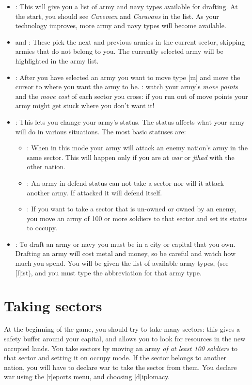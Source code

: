 \begin{itemize}

\item
{}: This will give you a list of army and navy types
available for drafting. At the start, you should see {\em Cavemen} and
{\em Caravans} in the list. As your technology improves, more army and
navy types will become available.
\item
{} and : These pick the next
and previous armies in the current sector, skipping armies that do not
belong to you.  The currently selected army will be highlighted in the
army list.
\item
{}: After you have selected an army you want to move type
[m] and move the cursor to where you want the army to be.
: watch your army's {\em move points} and the
{\em move cost} of each sector you cross: if you run out of move points
your army might get stuck where you don't want it!
\item
{}:  This lets you change your army's status.  The status
affects what your army will do in various situations.  The most basic
statuses are:

\begin{itemize}
\item
{}: When in this mode your army will attack an enemy
nation's army in the same sector.  This will happen only if you are at
{\em war} or {\em jihad} with the other nation.
\item
{}: An army in defend status can not take a sector nor
will it attack another army.  If attacked it will defend itself.
\item
{}: If you want to take a sector that is un-owned or owned
by an enemy, you move an army of 100 or more soldiers to that sector
and set its status to occupy.
\end{itemize}

\item
{}: To draft an army or navy you must be in a city or
capital that you own.  Drafting an army will cost metal and money, so
be careful and watch how much you spend.  You will be given the list
of available army types, (see [l]ist), and you must type the
abbreviation for that army type.

\end{itemize}

\section{Taking sectors}
At the beginning of the game, you should try to take many sectors:
this gives a safety buffer around your capital, and allows you to look
for resources in the new occupied lands.  You take sectors by moving
an army {\em of at least 100 soldiers} to that sector and setting it
on occupy mode.  If the sector belongs to another nation, you will
have to declare war to take the sector from them.  You declare
war using the [r]eports menu, and choosing [d]iplomacy.

